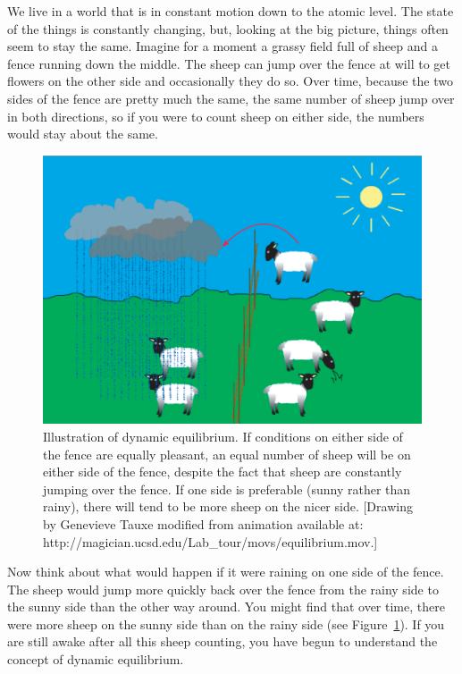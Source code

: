 We live in a world that is  in constant motion  down to the atomic level. The state of the things is constantly changing, but, looking at the big picture, things often seem to stay the same.  Imagine for a moment a grassy field full of sheep and  a fence running down the middle.  The sheep can jump over the fence at will to get flowers on the other side and occasionally they do so.   Over time, because the two sides of the fence  are pretty much the same, the same number of sheep jump over in both directions, so if you were to count sheep on either side, the numbers would stay about the same.



\begin{figure}[htb]
\centering  \includegraphics[width=10 cm]{EPSfiles/equilibrium.eps}
\caption{Illustration of dynamic equilibrium.  If conditions on either side of the fence are equally pleasant, an equal number of sheep will be on either side of the fence, despite the fact that sheep are constantly jumping over the fence.  If one side is preferable (sunny rather than rainy), there will tend to be more sheep on the nicer side.  [Drawing by Genevieve Tauxe modified from animation  available at: {http://magician.ucsd.edu/Lab\_tour/movs/equilibrium.mov}.]}
\label{fig:equilibrium}
\end{figure}

Now think about what would happen if it were raining on one side of the fence.   The sheep would jump more quickly back over the fence from the rainy side to the sunny side than the other way around. You might find that over time, there were more sheep on the sunny side than on the rainy side (see Figure~\ref{fig:equilibrium}).   If you are still awake after all this sheep counting, you have begun to understand the concept of dynamic equilibrium.



